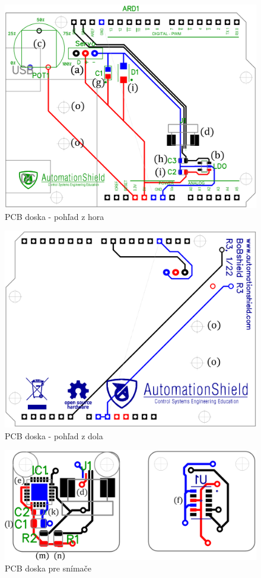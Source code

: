 \begin{figure}[p]
	\centering
	\includegraphics[width=125mm]{obr/PCBBOBup.eps}
	\caption{PCB doska - pohľad z hora }\label{OBRAZOK 2.1.3} 
\end{figure}  
 
 \begin{figure}[p]
 	\centering
 	\includegraphics[width=125mm]{obr/PCBBOBbottom.eps}
 	\caption{PCB doska - pohľad z dola}\label{OBRAZOK 2.1.4} 
 \end{figure} 

 \begin{figure}[h!]
	\centering
	\includegraphics[width=125mm]{obr/PCBsnimace.eps}
	\caption{PCB doska pre snímače}\label{OBRAZOK 2.1.5} 
\end{figure} 
